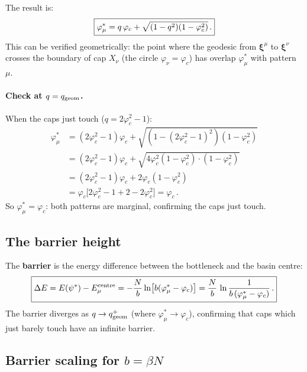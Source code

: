 \documentclass[11pt]{article}
\newcommand{\vp}{\varphi}
\newcommand{\bxi}{\boldsymbol{\xi}}
\begin{document}
The result is:
\begin{equation}\label{eq:phi_star}
  \boxed{%
  \vp_\mu^* = q\,\vp_c + \sqrt{(1-q^2)(1-\vp_c^2)}\,.}
\end{equation}
This can be verified geometrically: the point where
the geodesic from $\bxi^\mu$ to $\bxi^\nu$ crosses the
boundary of cap $X_\nu$ (the circle $\vp_\nu = \vp_c$)
has overlap $\vp_\mu^*$ with pattern $\mu$.

\paragraph{Check at $q = q_{\rm geom}$.}
When the caps just touch ($q = 2\vp_c^2 - 1$):
\begin{align}
  \vp_\mu^*
  &= (2\vp_c^2 - 1)\vp_c
    + \sqrt{(1 - (2\vp_c^2-1)^2)(1-\vp_c^2)}
  \nonumber\\
  &= (2\vp_c^2 - 1)\vp_c
    + \sqrt{4\vp_c^2(1-\vp_c^2) \cdot (1-\vp_c^2)}
  \nonumber\\
  &= (2\vp_c^2 - 1)\vp_c + 2\vp_c(1-\vp_c^2)
  \nonumber\\
  &= \vp_c\bigl[2\vp_c^2 - 1 + 2 - 2\vp_c^2\bigr]
  = \vp_c\,.
\end{align}
So $\vp_\mu^* = \vp_c$: both patterns are marginal, confirming
the caps just touch.


\subsection{The barrier height}

The \textbf{barrier} is the energy difference between the
bottleneck and the basin centre:
\begin{equation}\label{eq:barrier}
  \boxed{%
  \Delta E = E(\psi^*) - E_\mu^{\rm centre}
  = -\frac{N}{b}\ln\bigl[b(\vp_\mu^* - \vp_c)\bigr]
  = \frac{N}{b}\,\ln\frac{1}{b\,(\vp_\mu^* - \vp_c)}\,.}
\end{equation}
The barrier diverges as $q \to q_{\rm geom}^+$
(where $\vp_\mu^* \to \vp_c$), confirming that caps which
just barely touch have an infinite barrier.


\subsection{Barrier scaling for $b = \beta N$}
\end{document}
